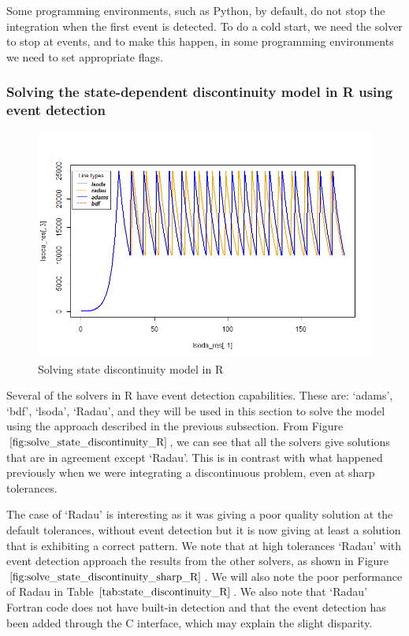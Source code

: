 Some programming environments, such as Python, by default, do not stop the integration when the first event is detected. To do a cold start, we need the solver to stop at events, and to make this happen, in some programming environments we need to set appropriate flags. 

\subsubsection{Solving the state-dependent discontinuity model in R using event detection}
\begin{figure}[H]
\centering
\includegraphics[width=0.7\linewidth]{./figures/solve_state_discontinuity_R}
\caption{Solving state discontinuity model in R}
\label{fig:solve_state_discontinuity_R}
\end{figure}
Several of the solvers in R have event detection capabilities. These are: `adams', `bdf', `lsoda', `Radau', and they will be used in this section to solve the model using the approach described in the previous subsection. From Figure $\ref{fig:solve_state_discontinuity_R}$, we can see that all the solvers give solutions that are in agreement except `Radau'. This is in contrast with what happened previously when we were integrating a discontinuous problem, even at sharp tolerances. 

The case of `Radau' is interesting as it was giving a poor quality solution at the default tolerances, without event detection but it is now giving at least a solution that is exhibiting a correct pattern. We note that at high tolerances `Radau' with event detection approach the results from the other solvers, as shown in Figure $\ref{fig:solve_state_discontinuity_sharp_R}$. We will also note the poor performance of Radau in Table $\ref{tab:state_discontinuity_R}$. We also note that `Radau' Fortran code does not have built-in detection and that the event detection has been added through the C interface, which may explain the slight disparity.


